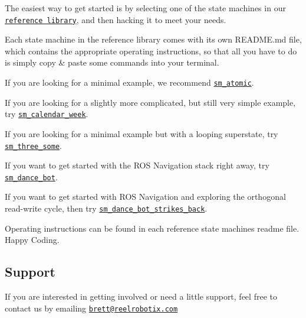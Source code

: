 The easiest way to get started is by selecting one of the state machines in our \href{https://github.com/reelrbtx/SMACC/tree/master/smacc_sm_reference_library}{\tt reference library}, and then hacking it to meet your needs.

Each state machine in the reference library comes with it\textquotesingle{}s own R\+E\+A\+D\+M\+E.\+md file, which contains the appropriate operating instructions, so that all you have to do is simply copy \& paste some commands into your terminal.


\begin{DoxyItemize}
\item If you are looking for a minimal example, we recommend \href{https://github.com/reelrbtx/SMACC/tree/master/smacc_sm_reference_library/sm_atomic}{\tt sm\+\_\+atomic}.
\item If you are looking for a slightly more complicated, but still very simple example, try \href{https://github.com/reelrbtx/SMACC/tree/master/smacc_sm_reference_library/sm_calendar_week}{\tt sm\+\_\+calendar\+\_\+week}.
\item If you are looking for a minimal example but with a looping superstate, try \href{https://github.com/reelrbtx/SMACC/tree/master/smacc_sm_reference_library/sm_three_some}{\tt sm\+\_\+three\+\_\+some}.
\item If you want to get started with the R\+OS Navigation stack right away, try \href{https://github.com/reelrbtx/SMACC/tree/master/smacc_sm_reference_library/sm_dance_bot}{\tt sm\+\_\+dance\+\_\+bot}.
\item If you want to get started with R\+OS Navigation and exploring the orthogonal read-\/write cycle, then try \href{https://github.com/reelrbtx/SMACC/tree/master/smacc_sm_reference_library/sm_dance_bot_strikes_back}{\tt sm\+\_\+dance\+\_\+bot\+\_\+strikes\+\_\+back}.
\end{DoxyItemize}

Operating instructions can be found in each reference state machines readme file. Happy Coding.

\subsection*{Support}

If you are interested in getting involved or need a little support, feel free to contact us by emailing \href{mailto:brett@reelrobotix.com}{\tt brett@reelrobotix.\+com} 